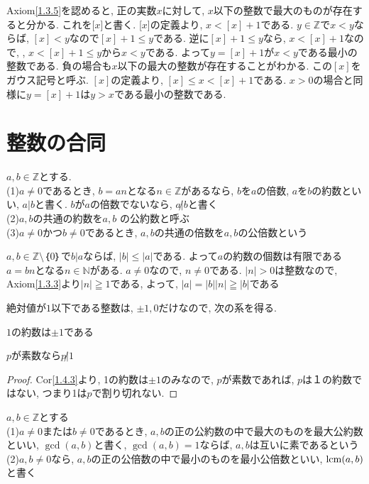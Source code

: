 Axiom\ref{1.3.5}を認めると, 正の実数$x$に対して, $x$以下の整数で最大のものが存在すると分かる. これを[$x$]と書く. [$x$]の定義より, $x<[x]+1$である. $y\in\mathbb{Z}$で$x<y$ならば, $[x]<y$なので$[x]+1\leq y$である. 
逆に$[x]+1\leq y$なら, $x<[x]+1$なので, , $x<[x]+1\leq yからx<y$である. よって$y=[x]+1$が$x<y$である最小の整数である. 負の場合も$x$以下の最大の整数が存在することがわかる. この$[x]$をガウス記号と呼ぶ. 
$[x]$の定義より, $[x]\leq x<[x]+1$である. $x>0$の場合と同様に$y=[x]+1$は$y>x$である最小の整数である. 


\section{整数の合同}

\begin{dfn}\label{1.4.1}
$a, b\in\mathbb{Z}$とする. 
\\(1)$a\ne0$であるとき, $b=an$となる$n\in\mathbb{Z}$があるなら, $b$を$a$の倍数, $a$を$b$の約数といい, $a|b$と書く. $b$が$a$の倍数でないなら, $a\not|b$と書く
\\(2)$a, b$の共通の約数を$a, b$ の公約数と呼ぶ
\\(3)$a\ne0$かつ$b\ne0$であるとき, $a, b$の共通の倍数を$a, b$の公倍数という
\end{dfn}

\begin{prop}\label{1.4.2}
$a, b\in\mathbb{Z}\setminus {｛0｝}$で$b|a$ならば, $|b|\leq|a|$である. よって$a$の約数の個数は有限である
$a=bn$となる$n\in\mathbb{N}$がある. $a\ne0$なので, $n\ne0$である. $|n|>0$は整数なので, Axiom\ref{1.3.3}より$|n|\geqq1$である, よって, $|a|=|b||n|\geqq|b|$である
\end{prop}


絶対値が$1$以下である整数は, $\pm1, 0$だけなので, 次の系を得る. 

\begin{cor}\label{1.4.3}
\quad $1$の約数は$\pm1$である
\end{cor}

\begin{cor}\label{1.4.4}
\quad $p$が素数なら$p\not|1$
\end{cor}
\begin{proof}
Cor\ref{1.4.3}より, 1の約数は$\pm1$のみなので, $p$が素数であれば, $p$は１の約数ではない, つまり1は$p$で割り切れない. 
\end{proof}

\begin{dfn}\label{1.4.5}
$a, b\in\mathbb{Z}$とする
\\(1)$a\ne0$または$b\ne0$であるとき, $a, b$の正の公約数の中で最大のものを最大公約数といい, $\gcd(a, b)$と書く, $\gcd(a, b)=1$ならば, $a, b$は互いに素であるという
\\(2)$a, b\ne0$なら, $a, b$の正の公倍数の中で最小のものを最小公倍数といい, $\operatorname{lcm}(a, b)$と書く
\end{dfn}

